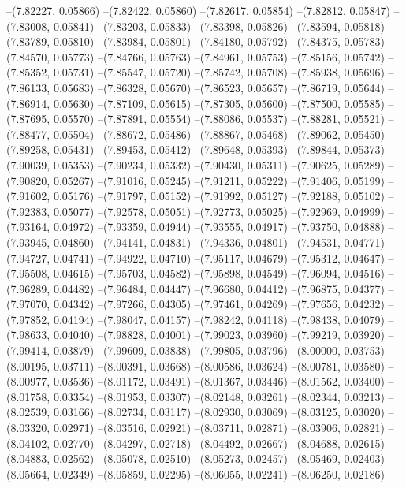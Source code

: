 --(7.82227, 0.05866)
--(7.82422, 0.05860)
--(7.82617, 0.05854)
--(7.82812, 0.05847)
--(7.83008, 0.05841)
--(7.83203, 0.05833)
--(7.83398, 0.05826)
--(7.83594, 0.05818)
--(7.83789, 0.05810)
--(7.83984, 0.05801)
--(7.84180, 0.05792)
--(7.84375, 0.05783)
--(7.84570, 0.05773)
--(7.84766, 0.05763)
--(7.84961, 0.05753)
--(7.85156, 0.05742)
--(7.85352, 0.05731)
--(7.85547, 0.05720)
--(7.85742, 0.05708)
--(7.85938, 0.05696)
--(7.86133, 0.05683)
--(7.86328, 0.05670)
--(7.86523, 0.05657)
--(7.86719, 0.05644)
--(7.86914, 0.05630)
--(7.87109, 0.05615)
--(7.87305, 0.05600)
--(7.87500, 0.05585)
--(7.87695, 0.05570)
--(7.87891, 0.05554)
--(7.88086, 0.05537)
--(7.88281, 0.05521)
--(7.88477, 0.05504)
--(7.88672, 0.05486)
--(7.88867, 0.05468)
--(7.89062, 0.05450)
--(7.89258, 0.05431)
--(7.89453, 0.05412)
--(7.89648, 0.05393)
--(7.89844, 0.05373)
--(7.90039, 0.05353)
--(7.90234, 0.05332)
--(7.90430, 0.05311)
--(7.90625, 0.05289)
--(7.90820, 0.05267)
--(7.91016, 0.05245)
--(7.91211, 0.05222)
--(7.91406, 0.05199)
--(7.91602, 0.05176)
--(7.91797, 0.05152)
--(7.91992, 0.05127)
--(7.92188, 0.05102)
--(7.92383, 0.05077)
--(7.92578, 0.05051)
--(7.92773, 0.05025)
--(7.92969, 0.04999)
--(7.93164, 0.04972)
--(7.93359, 0.04944)
--(7.93555, 0.04917)
--(7.93750, 0.04888)
--(7.93945, 0.04860)
--(7.94141, 0.04831)
--(7.94336, 0.04801)
--(7.94531, 0.04771)
--(7.94727, 0.04741)
--(7.94922, 0.04710)
--(7.95117, 0.04679)
--(7.95312, 0.04647)
--(7.95508, 0.04615)
--(7.95703, 0.04582)
--(7.95898, 0.04549)
--(7.96094, 0.04516)
--(7.96289, 0.04482)
--(7.96484, 0.04447)
--(7.96680, 0.04412)
--(7.96875, 0.04377)
--(7.97070, 0.04342)
--(7.97266, 0.04305)
--(7.97461, 0.04269)
--(7.97656, 0.04232)
--(7.97852, 0.04194)
--(7.98047, 0.04157)
--(7.98242, 0.04118)
--(7.98438, 0.04079)
--(7.98633, 0.04040)
--(7.98828, 0.04001)
--(7.99023, 0.03960)
--(7.99219, 0.03920)
--(7.99414, 0.03879)
--(7.99609, 0.03838)
--(7.99805, 0.03796)
--(8.00000, 0.03753)
--(8.00195, 0.03711)
--(8.00391, 0.03668)
--(8.00586, 0.03624)
--(8.00781, 0.03580)
--(8.00977, 0.03536)
--(8.01172, 0.03491)
--(8.01367, 0.03446)
--(8.01562, 0.03400)
--(8.01758, 0.03354)
--(8.01953, 0.03307)
--(8.02148, 0.03261)
--(8.02344, 0.03213)
--(8.02539, 0.03166)
--(8.02734, 0.03117)
--(8.02930, 0.03069)
--(8.03125, 0.03020)
--(8.03320, 0.02971)
--(8.03516, 0.02921)
--(8.03711, 0.02871)
--(8.03906, 0.02821)
--(8.04102, 0.02770)
--(8.04297, 0.02718)
--(8.04492, 0.02667)
--(8.04688, 0.02615)
--(8.04883, 0.02562)
--(8.05078, 0.02510)
--(8.05273, 0.02457)
--(8.05469, 0.02403)
--(8.05664, 0.02349)
--(8.05859, 0.02295)
--(8.06055, 0.02241)
--(8.06250, 0.02186)
